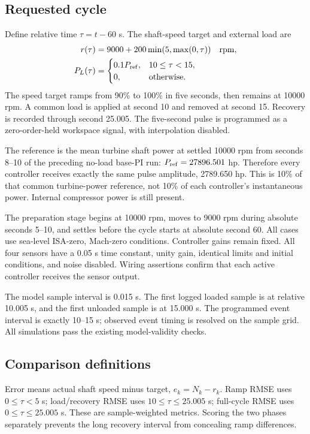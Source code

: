 \subsection{Requested cycle}
Define relative time $\tau=t-60$ s. The shaft-speed target and external load are
\begin{align}
r(\tau)&=9000+200\min(5,\max(0,\tau))\quad\mathrm{rpm},\\
P_L(\tau)&=\begin{cases}0.1P_{\rm ref},&10\le\tau<15,\\0,&\text{otherwise}.\end{cases}
\end{align}
The speed target ramps from 90\% to 100\% in five seconds, then remains at 10000 rpm. A common load is applied at second 10 and removed at second 15. Recovery is recorded through second 25.005. The five-second pulse is programmed as a zero-order-held workspace signal, with interpolation disabled.

The reference is the mean turbine shaft power at settled 10000 rpm from seconds 8--10 of the preceding no-load base-PI run: $P_{\rm ref}=27896.501$ hp. Therefore every controller receives exactly the same pulse amplitude, 2789.650 hp. This is 10\% of that common turbine-power reference, not 10\% of each controller's instantaneous power. Internal compressor power is still present.

The preparation stage begins at 10000 rpm, moves to 9000 rpm during absolute seconds 5--10, and settles before the cycle starts at absolute second 60. All cases use sea-level ISA-zero, Mach-zero conditions. Controller gains remain fixed. All four sensors have a 0.05 s time constant, unity gain, identical limits and initial conditions, and noise disabled. Wiring assertions confirm that each active controller receives the sensor output.

The model sample interval is 0.015 s. The first logged loaded sample is at relative 10.005 s, and the first unloaded sample is at 15.000 s. The programmed event interval is exactly 10--15 s; observed event timing is resolved on the sample grid. All simulations pass the existing model-validity checks.
\subsection{Comparison definitions}
Error means actual shaft speed minus target, $e_k=N_k-r_k$. Ramp RMSE uses $0\le\tau<5$ s; load/recovery RMSE uses $10\le\tau\le25.005$ s; full-cycle RMSE uses $0\le\tau\le25.005$ s. These are sample-weighted metrics. Scoring the two phases separately prevents the long recovery interval from concealing ramp differences.

